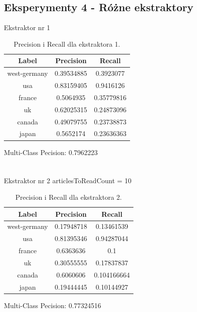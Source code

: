 \documentclass{classrep}
\begin{document}
\subsection{Eksperymenty 4 - Różne ekstraktory}
Ekstraktor nr 1
\begin{table}[H]
\begin{tabular}{|c|c|c|}
\hline
Label        & Precision  & Recall     \\ \hline
west-germany & 0.39534885 & 0.3923077  \\ \hline
usa          & 0.83159405 & 0.9416126  \\ \hline
france       & 0.5064935  & 0.35779816 \\ \hline
uk           & 0.62025315 & 0.24873096 \\ \hline
canada       & 0.49079755 & 0.23738873 \\ \hline
japan        & 0.5652174  & 0.23636363 \\ \hline
\end{tabular}
\caption{Precision i Recall dla ekstraktora 1.}
\end{table}
Multi-Class Pecision: 0.7962223\\
\\
\\
Ekstraktor nr 2
articlesToReadCount = 10
\begin{table}[H]
\begin{tabular}{|c|c|c|}
\hline
Label        & Precision  & Recall      \\ \hline
west-germany & 0.17948718 & 0.13461539  \\ \hline
usa          & 0.81395346 & 0.94287044  \\ \hline
france       & 0.6363636  & 0.1         \\ \hline
uk           & 0.30555555 & 0.17837837  \\ \hline
canada       & 0.6060606  & 0.104166664 \\ \hline
japan        & 0.19444445 & 0.10144927  \\ \hline
\end{tabular}
\caption{Precision i Recall dla ekstraktora 2.}
\end{table}
Multi-Class Pecision: 0.77324516
\end{document}
